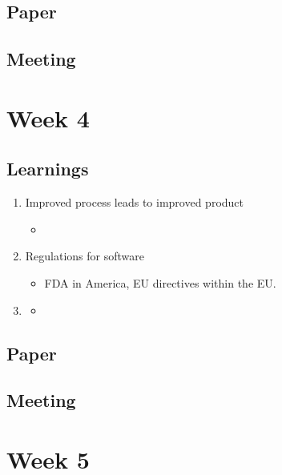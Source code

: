 \section{Paper}

\section{Meeting}
\chapter{Week 4}

\section{Learnings}
\begin{enumerate}
\item Improved process leads to improved product
\begin{itemize}
\item
\end{itemize}
\item Regulations for software
\begin{itemize}
\item FDA in America, EU directives within the EU.
\end{itemize}
\item
\begin{itemize}
\item
\end{itemize}
\end{enumerate}

\section{Paper}

\section{Meeting}
\chapter{Week 5}

